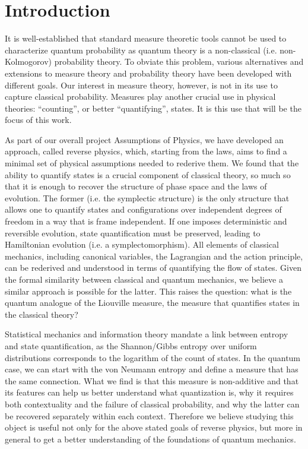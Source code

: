\documentclass[entropy,article,submit,pdftex,moreauthors]{Definitions/mdpi}
\begin{document}

\section{Introduction}

It is well-established that standard measure theoretic tools cannot be used to characterize quantum probability as quantum theory is a non-classical (i.e. non-Kolmogorov) probability theory. To obviate this problem, various alternatives and extensions to measure theory and probability theory have been developed with different goals.\cite{groenewold1946principles, moyal1949quantum, gleason1957measures, sorkin1994quantum, hamhalter2003quantum, gudder2009quantum, svozil2022extending, monchietti2023measure} Our interest in measure theory, however, is not in its use to capture classical probability. Measures play another crucial use in physical theories: ``counting'', or better ``quantifying'', states. It is this use that will be the focus of this work.

As part of our overall project Assumptions of Physics,\cite{aop-book} we have developed an approach, called reverse physics,\cite{aop-phys-ReversePhysics} which, starting from the laws, aims to find a minimal set of physical assumptions needed to rederive them. We found that the ability to quantify states is a crucial component of classical theory, so much so that it is enough to recover the structure of phase space and the laws of evolution.\cite{aop-phil-Hamiltonianinformation,aop-phil-HamiltonianPrivilege} The former (i.e. the symplectic structure) is the only structure that allows one to quantify states and configurations over independent degrees of freedom in a way that is frame independent. If one imposes deterministic and reversible evolution, state quantification must be preserved, leading to Hamiltonian evolution (i.e. a symplectomorphism). All elements of classical mechanics, including canonical variables, the Lagrangian and the action principle, \cite{aop-phys-ActionPrincipleInterpretation} can be rederived and understood in terms of quantifying the flow of states. Given the formal similarity between classical and quantum mechanics, we believe a similar approach is possible for the latter. This raises the question: what is the quantum analogue of the Liouville measure, the measure that quantifies states in the classical theory?

Statistical mechanics and information theory mandate a link between entropy and state quantification, as the Shannon/Gibbs entropy over uniform distributions corresponds to the logarithm of the count of states. In the quantum case, we can start with the von Neumann entropy and define a measure that has the same connection. What we find is that this measure is non-additive and that its features can help us better understand what quantization is, why it requires both contextuality and the failure of classical probability, and why the latter can be recovered separately within each context. Therefore we believe studying this object is useful not only for the above stated goals of reverse physics, but more in general to get a better understanding of the foundations of quantum mechanics.
\end{document}
